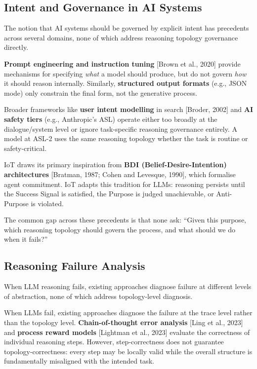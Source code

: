 \documentclass[11pt,a4paper]{article}
\begin{document}
\subsection{Intent and Governance in AI
Systems}\label{intent-and-governance-in-ai-systems}

The notion that AI systems should be governed by explicit intent has
precedents across several domains, none of which address reasoning
topology governance directly.

\textbf{Prompt engineering and instruction tuning} {[}Brown et al.,
2020{]} provide mechanisms for specifying \emph{what} a model should
produce, but do not govern \emph{how} it should reason internally.
Similarly, \textbf{structured output formats} (e.g., JSON mode) only
constrain the final form, not the generative process.

Broader frameworks like \textbf{user intent modelling} in search
{[}Broder, 2002{]} and \textbf{AI safety tiers} (e.g., Anthropic's ASL)
operate either too broadly at the dialogue/system level or ignore
task-specific reasoning governance entirely. A model at ASL-2 uses the
same reasoning topology whether the task is routine or safety-critical.

IoT draws its primary inspiration from \textbf{BDI
(Belief-Desire-Intention) architectures} {[}Bratman, 1987; Cohen and
Levesque, 1990{]}, which formalise agent commitment. IoT adapts this
tradition for LLMs: reasoning persists until the Success Signal is
satisfied, the Purpose is judged unachievable, or Anti-Purpose is
violated.

The common gap across these precedents is that none ask: ``Given this
purpose, which reasoning topology should govern the process, and what
should we do when it fails?''

\subsection{Reasoning Failure
Analysis}\label{reasoning-failure-analysis}

When LLM reasoning fails, existing approaches diagnose failure at
different levels of abstraction, none of which address topology-level
diagnosis.

When LLMs fail, existing approaches diagnose the failure at the trace
level rather than the topology level. \textbf{Chain-of-thought error
analysis} {[}Ling et al., 2023{]} and \textbf{process reward models}
{[}Lightman et al., 2023{]} evaluate the correctness of individual
reasoning steps. However, step-correctness does not guarantee
topology-correctness: every step may be locally valid while the overall
structure is fundamentally misaligned with the intended task.
\end{document}
